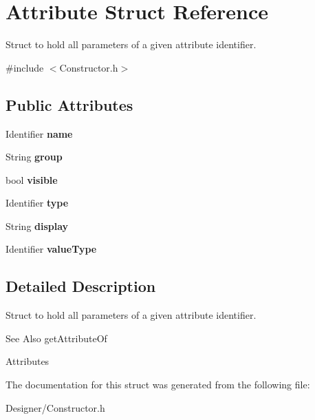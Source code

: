 \hypertarget{struct_attribute}{\section{Attribute Struct Reference}
\label{struct_attribute}
}


Struct to hold all parameters of a given attribute identifier.  




{\ttfamily \#include $<$Constructor.\-h$>$}

\subsection*{Public Attributes}
\begin{DoxyCompactItemize}
\item 
\hypertarget{struct_attribute_a365b41cf28a792401ad145529e8e0980}{Identifier {\bfseries name}}\label{struct_attribute_a365b41cf28a792401ad145529e8e0980}

\item 
\hypertarget{struct_attribute_a507acf1e4de2cd6da2a6ddb116b2a90f}{String {\bfseries group}}\label{struct_attribute_a507acf1e4de2cd6da2a6ddb116b2a90f}

\item 
\hypertarget{struct_attribute_a83dafc8acd95332429cc74120d847b44}{bool {\bfseries visible}}\label{struct_attribute_a83dafc8acd95332429cc74120d847b44}

\item 
\hypertarget{struct_attribute_a4c8a15a28e43ae4395feec8ce19c32aa}{Identifier {\bfseries type}}\label{struct_attribute_a4c8a15a28e43ae4395feec8ce19c32aa}

\item 
\hypertarget{struct_attribute_a1fcda51258d72e64a8c2527bd723c2fa}{String {\bfseries display}}\label{struct_attribute_a1fcda51258d72e64a8c2527bd723c2fa}

\item 
\hypertarget{struct_attribute_a6b736c33181fe639b8fd9339c36c1f1e}{Identifier {\bfseries value\-Type}}\label{struct_attribute_a6b736c33181fe639b8fd9339c36c1f1e}

\end{DoxyCompactItemize}


\subsection{Detailed Description}
Struct to hold all parameters of a given attribute identifier. 

\begin{DoxySeeAlso}{See Also}
get\-Attribute\-Of 

Attributes 
\end{DoxySeeAlso}


The documentation for this struct was generated from the following file\-:\begin{DoxyCompactItemize}
\item 
Designer/Constructor.\-h\end{DoxyCompactItemize}
